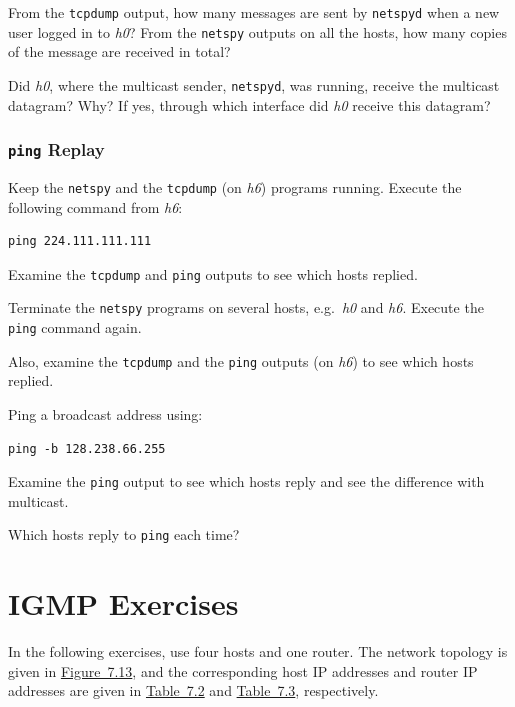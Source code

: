 \documentclass{../UTNetLab}
\begin{document}
    \begin{report}
    \item From the \lstinline{tcpdump} output, how many messages are sent by \lstinline{netspyd} when a new user logged in to \textit{h0}?
    From the \lstinline{netspy} outputs on all the hosts, how many copies of the message are received in total?

    \item Did \textit{h0}, where the multicast sender, \lstinline{netspyd}, was running, receive the multicast datagram?
    Why?
    If yes, through which interface did \textit{h0} receive this datagram?
    \end{report}

\section{\texttt{ping} Replay}
    Keep the \lstinline{netspy} and the \lstinline{tcpdump} (on \textit{h6}) programs running.
    Execute the following command from \textit{h6}:
    \begin{lstlisting}
ping 224.111.111.111
    \end{lstlisting}
    Examine the \lstinline{tcpdump} and \lstinline{ping} outputs to see which hosts replied.

    Terminate the \lstinline{netspy} programs on several hosts, e.g.\ \textit{h0} and \textit{h6}.
    Execute the \lstinline{ping} command again.

    Also, examine the \lstinline{tcpdump} and the \lstinline{ping} outputs (on \textit{h6}) to see which hosts replied.

    Ping a broadcast address using:
    \begin{lstlisting}
ping -b 128.238.66.255
    \end{lstlisting}
    Examine the \lstinline{ping} output to see which hosts reply and see the difference with multicast.


    \begin{report}
    \item Which hosts reply to \lstinline{ping} each time?
    \end{report}

\part{IGMP Exercises}\label{sec:igmp}
    In the following exercises, use four hosts and one router. The network topology is given in \hyperref[fig:7.13]{Figure~7.13}, and the corresponding host IP addresses and router IP addresses are given in \hyperref[tab:7.2]{Table~7.2} and \hyperref[tab:7.3]{Table~7.3}, respectively.
\end{document}
